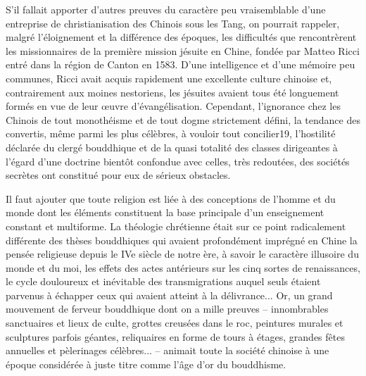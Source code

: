 S'il fallait apporter d'autres preuves du caractère peu vraisemblable
d'une entreprise de christianisation des Chinois sous les Tang, on
pourrait rappeler, malgré l'éloignement et la différence des époques,
les difficultés que rencontrèrent les missionnaires de
la première mission jésuite en Chine, fondée par Matteo Ricci entré dans
la région de Canton en 1583. D'une intelligence et d'une mémoire peu
communes, Ricci avait acquis rapidement une excellente culture chinoise
et, contrairement aux moines nestoriens, les jésuites avaient tous été
longuement formés en vue de leur œuvre d'évangélisation. Cependant,
l'ignorance chez les Chinois de tout monothéisme et de tout dogme
strictement défini, la tendance des convertis, même parmi les plus
célèbres, à vouloir tout concilier19, l'hostilité déclarée du clergé
bouddhique et de la quasi totalité des classes dirigeantes à l'égard
d'une doctrine bientôt confondue avec celles, très redoutées, des
sociétés secrètes ont constitué pour eux de sérieux obstacles.

Il faut ajouter que toute religion est liée à des conceptions de
l'homme et du monde dont les éléments constituent la base principale
d'un enseignement constant et multiforme. La théologie chrétienne était
sur ce point radicalement différente des thèses bouddhiques qui avaient
profondément imprégné en Chine la pensée religieuse depuis le IVe siècle
de notre ère, à savoir le caractère illusoire du monde et du moi, les
effets des actes antérieurs sur les cinq sortes de renaissances, le
cycle douloureux et inévitable des transmigrations auquel seuls étaient
parvenus à échapper ceux qui avaient atteint à la délivrance... Or, un
grand mouvement de ferveur bouddhique dont on a mille preuves --
innombrables sanctuaires et lieux de culte, grottes creusées dans le
roc, peintures murales et sculptures parfois géantes, reliquaires en
forme de tours à étages, grandes fêtes annuelles et pèlerinages
célèbres... -- animait toute la société chinoise à une époque considérée à juste titre comme l'âge d'or du bouddhisme.


